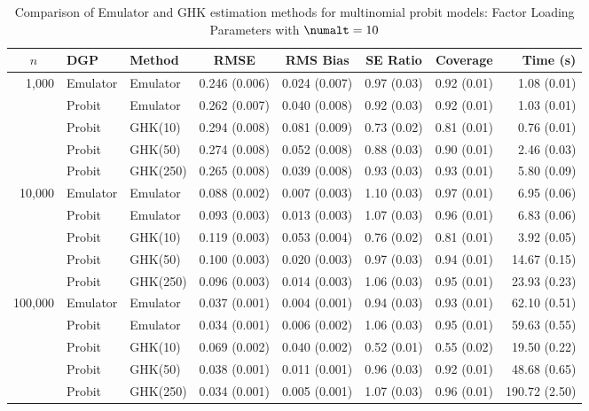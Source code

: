 \begin{table}[htbp]
\centering
\footnotesize
\begin{tabular}{@{}rllrrrrr@{}}
\toprule
\multicolumn{1}{c}{$n$} & \multicolumn{1}{l}{DGP} & \multicolumn{1}{l}{Method} & \multicolumn{1}{c}{RMSE} & \multicolumn{1}{c}{RMS Bias} & \multicolumn{1}{c}{SE Ratio} & \multicolumn{1}{c}{Coverage} & \multicolumn{1}{r}{Time (s)} \\
\midrule
\multirow{5}{*}{1,000} & Emulator & Emulator & 0.246 (0.006) & 0.024 (0.007) & 0.97 (0.03) & 0.92 (0.01) & 1.08 (0.01) \\
 & Probit & Emulator & 0.262 (0.007) & 0.040 (0.008) & 0.92 (0.03) & 0.92 (0.01) & 1.03 (0.01) \\
 & Probit & GHK(10) & 0.294 (0.008) & 0.081 (0.009) & 0.73 (0.02) & 0.81 (0.01) & 0.76 (0.01) \\
 & Probit & GHK(50) & 0.274 (0.008) & 0.052 (0.008) & 0.88 (0.03) & 0.90 (0.01) & 2.46 (0.03) \\
 & Probit & GHK(250) & 0.265 (0.008) & 0.039 (0.008) & 0.93 (0.03) & 0.93 (0.01) & 5.80 (0.09) \\
\midrule
\multirow{5}{*}{10,000} & Emulator & Emulator & 0.088 (0.002) & 0.007 (0.003) & 1.10 (0.03) & 0.97 (0.01) & 6.95 (0.06) \\
 & Probit & Emulator & 0.093 (0.003) & 0.013 (0.003) & 1.07 (0.03) & 0.96 (0.01) & 6.83 (0.06) \\
 & Probit & GHK(10) & 0.119 (0.003) & 0.053 (0.004) & 0.76 (0.02) & 0.81 (0.01) & 3.92 (0.05) \\
 & Probit & GHK(50) & 0.100 (0.003) & 0.020 (0.003) & 0.97 (0.03) & 0.94 (0.01) & 14.67 (0.15) \\
 & Probit & GHK(250) & 0.096 (0.003) & 0.014 (0.003) & 1.06 (0.03) & 0.95 (0.01) & 23.93 (0.23) \\
\midrule
\multirow{5}{*}{100,000} & Emulator & Emulator & 0.037 (0.001) & 0.004 (0.001) & 0.94 (0.03) & 0.93 (0.01) & 62.10 (0.51) \\
 & Probit & Emulator & 0.034 (0.001) & 0.006 (0.002) & 1.06 (0.03) & 0.95 (0.01) & 59.63 (0.55) \\
 & Probit & GHK(10) & 0.069 (0.002) & 0.040 (0.002) & 0.52 (0.01) & 0.55 (0.02) & 19.50 (0.22) \\
 & Probit & GHK(50) & 0.038 (0.001) & 0.011 (0.001) & 0.96 (0.03) & 0.92 (0.01) & 48.68 (0.65) \\
 & Probit & GHK(250) & 0.034 (0.001) & 0.005 (0.001) & 1.07 (0.03) & 0.96 (0.01) & 190.72 (2.50) \\
\bottomrule
\end{tabular}
\caption{Comparison of Emulator and GHK estimation methods for multinomial probit models: Factor Loading Parameters with $\numalt=10$}
\label{tab:emulator_vs_ghk:10:gamma}
\end{table}